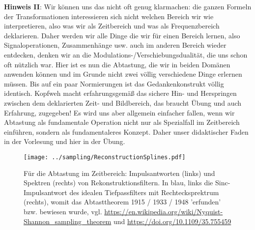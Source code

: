 \textbf{Hinweis II}: Wir können uns das nicht oft genug klarmachen: die ganzen
Formeln der Transformationen interessieren sich nicht welchen Bereich wir wie
interpretieren,
also was wir als Zeitbereich und was als Frequenzbereich deklarieren. Daher werden
wir alle Dinge die wir für einen Bereich lernen, also Signaloperationen, Zusammenhänge usw.
auch im anderen Bereich wieder entdecken, denken wir an die Modulations-/Verschiebungsdualität,
die uns schon oft nützlich war.
Hier ist es nun die Abtastung, die wir in beiden Domänen anwenden können und
im Grunde nicht zwei völlig verschiedene Dinge erlernen müssen. Bis auf ein
paar Normierungen ist das Gedankenkonstrukt völlig identisch. Kopfweh macht
erfahrungsgemäß das sichere Hin- und Herspringen zwischen dem deklarierten
Zeit- und Bildbereich,
das braucht Übung und auch Erfahrung, zugegeben! Es wird uns aber allgemein
einfacher fallen, wenn wir Abtastung als fundamentale Operation
nicht nur als Spezialfall im Zeitbereich einführen, sondern als fundamentaleres
Konzept. Daher unser didaktischer Faden in der Vorlesung und hier in der
Übung.



\begin{figure}
\texttt{[image: ../sampling/ReconstructionSplines.pdf]}
  \caption{Für die Abtastung im Zeitbereich: Impulsantworten (links) und
  Spektren (rechts) von
  Rekonstruktionsfiltern. In blau, links die Sinc-Impulsantwort des idealen
  Tiefpassfilters mit Rechtecksprektrum (rechts),
  womit das Abtasttheorem 1915 / 1933 / 1948 'erfunden' bzw. bewiesen wurde,
  vgl. \url{https://en.wikipedia.org/wiki/Nyquist-Shannon_sampling_theorem} und
  \url{https://doi.org/10.1109/35.755459}}
  \label{fig:ReconstructionSplines}
\end{figure}



\clearpage
